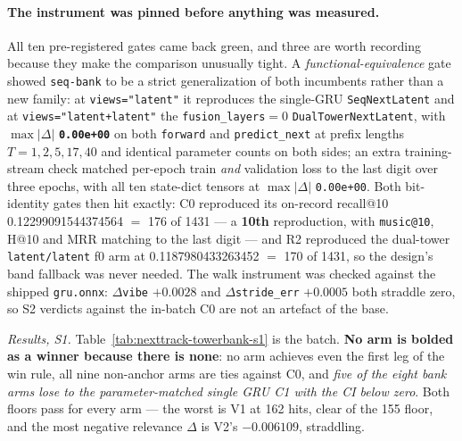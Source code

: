 \documentclass[11pt]{article}
\begin{document}
\paragraph{The instrument was pinned before anything was measured.} All ten
pre-registered gates came back green, and three are worth recording because they
make the comparison unusually tight. A \emph{functional-equivalence} gate showed
\texttt{seq-bank} to be a strict generalization of both incumbents rather than a
new family: at \texttt{views="latent"} it reproduces the single-GRU
\texttt{SeqNextLatent} and at \texttt{views="latent+latent"} the
\texttt{fusion\_layers}${}=0$ \texttt{DualTowerNextLatent}, with $\max|\Delta|$
\textbf{\texttt{0.00e+00}} on both \texttt{forward} and \texttt{predict\_next} at
prefix lengths $T=1,2,5,17,40$ and identical parameter counts on both sides; an
extra training-stream check matched per-epoch train \emph{and} validation loss to
the last digit over three epochs, with all ten state-dict tensors at
$\max|\Delta|$ \texttt{0.00e+00}. Both bit-identity gates then hit exactly: C0
reproduced its on-record recall@10 \num{0.12299091544374564} $=$ \num{176} of
\num{1431} --- a \textbf{10th} reproduction, with \texttt{music@10}, H@10 and MRR
matching to the last digit --- and R2 reproduced the dual-tower
\texttt{latent/latent} f0 arm at \num{0.1187980433263452} $=$ \num{170} of
\num{1431}, so the design's band fallback was never needed. The walk instrument
was checked against the shipped \texttt{gru.onnx}: $\Delta$\texttt{vibe}
$+\num{0.0028}$ and $\Delta$\texttt{stride\_err} $+\num{0.0005}$ both straddle
zero, so S2 verdicts against the in-batch C0 are not an artefact of the base.

\emph{Results, S1.} Table~\ref{tab:nexttrack-towerbank-s1} is the batch.
\textbf{No arm is bolded as a winner because there is none}: no arm achieves even
the first leg of the win rule, all nine non-anchor arms are ties against C0, and
\emph{five of the eight bank arms lose to the parameter-matched single GRU C1 with
the CI below zero}. Both floors pass for every arm --- the worst is V1 at
\num{162} hits, clear of the \num{155} floor, and the most negative relevance
$\Delta$ is V2's $-\num{0.006109}$, straddling.
\end{document}
